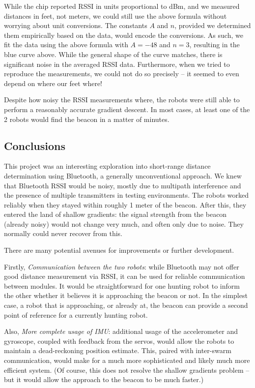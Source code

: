 \documentclass[]{article}
\begin{document}
While the chip reported RSSI in units proportional to dBm, and we
measured distances in feet, not meters, we could still use the above
formula without worrying about unit conversions. The constants $A$ and
$n$, provided we determined them empirically based on the data, would
encode the conversions. As such, we fit the data using the above formula
with $A=-48$ and $n=3$, resulting in the blue curve above. While the
general shape of the curve matches, there is significant noise in the
averaged RSSI data. Furthermore, when we tried to reproduce the
measurements, we could not do so precisely -- it seemed to even depend
on where our feet where!

Despite how noisy the RSSI measurements where, the robots were still
able to perform a reasonably accurate gradient descent. In most cases,
at least one of the 2 robots would find the beacon in a matter of
minutes.

\subsection{Conclusions}

This project was an interesting exploration into short-range distance
determination using Bluetooth, a generally unconventional approach.
We knew that Bluetooth RSSI would be noisy, mostly due to multipath interference and the presence of multiple transmitters in testing environments.
The robots worked reliably when they stayed within roughly 1 meter of the beacon.
After this, they entered the land of shallow gradients:
the signal strength from the beacon (already noisy) would not change very
much, and often only due to noise.
They normally could never recover from this.



There are many potential avenues for improvements or further
development.

Firstly, \emph{Communication between the two robots}: while Bluetooth may not offer good distance measurement via RSSI, it can be used for reliable  communication between modules.
It would be straightforward for one hunting robot to inform the other whether it believes it is approaching the beacon or not.
In the simplest case, a robot that is approaching, or already at, the beacon can provide a second point of reference for a currently hunting robot.

Also, \emph{More complete usage of IMU}: additional usage of the accelerometer and gyroscope, coupled with feedback from the servos, would allow the robots to maintain a dead-reckoning position estimate.
This, paired with inter-swarm communication, would make for a much more sophisticated and likely much more efficient system.
(Of course, this does not resolve the shallow gradients problem -- but it would allow the approach to the beacon to be much faster.)

{}

\end{document}
